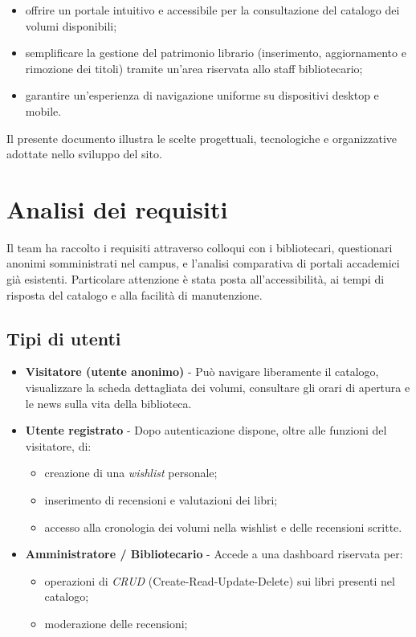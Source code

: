\documentclass{article}
\begin{document}
\begin{itemize}
    \item offrire un portale intuitivo e accessibile per la consultazione del catalogo dei volumi disponibili;
    \item semplificare la gestione del patrimonio librario (inserimento, aggiornamento e rimozione dei titoli) tramite un'area riservata allo staff bibliotecario;
    \item garantire un'esperienza di navigazione uniforme su dispositivi desktop e mobile.
\end{itemize}

Il presente documento illustra le scelte progettuali, tecnologiche e organizzative adottate nello sviluppo del sito.


\newpage

\section{Analisi dei requisiti}
Il team ha raccolto i requisiti attraverso colloqui con i bibliotecari, questionari anonimi somministrati nel campus, e l'analisi comparativa di portali accademici già esistenti.  
Particolare attenzione è stata posta all'accessibilità, ai tempi di risposta del catalogo e alla facilità di manutenzione.


\subsection{Tipi di utenti}
\begin{itemize}
    \item \textbf{Visitatore (utente anonimo)} - Può navigare liberamente il catalogo, visualizzare la scheda dettagliata dei volumi, consultare gli orari di apertura e le news sulla vita della biblioteca.  
    \item \textbf{Utente registrato} - Dopo autenticazione dispone, oltre alle funzioni del visitatore, di:
          \begin{itemize}
              \item creazione di una \emph{wishlist} personale;
              \item inserimento di recensioni e valutazioni dei libri;
              \item accesso alla cronologia dei volumi nella wishlist e delle recensioni scritte.
          \end{itemize}
    \item \textbf{Amministratore / Bibliotecario} - Accede a una dashboard riservata per:
          \begin{itemize}
              \item operazioni di \emph{CRUD} (Create-Read-Update-Delete) sui libri presenti nel catalogo;
              \item moderazione delle recensioni;
          \end{itemize}
\end{itemize}
\end{document}
